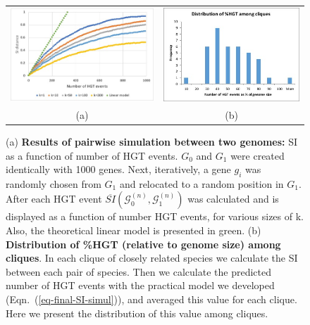 \documentclass[runningheads, 11pt]{llncs}
\newcommand{\G}{\mathcal{G}^{(n)}}
\begin{document}
\begin{figure}[tb]
\begin{center}

\begin{tabular}{cc}
\hspace{-1.5cm}
\includegraphics[width = 3.7in,angle=0]{figs/simul.jpg} &
\includegraphics[width = 3.5in,angle=0]{figs/real-data-HGT-distr.jpg} \\
 (a) & %
 (b) 
\end{tabular}
\caption{\small (a) {\bf Results of pairwise simulation between two genomes:} SI
as a function of number of HGT events. $G_0$ and $G_1$ were created identically
with 1000 genes. Next, iteratively, a gene $g_i$ was randomly chosen from $G_1$
and relocated to a random position in $G_1$. After each HGT event
$\overline{SI}(\G_0, \G_1)$ was calculated and is displayed as a function of
number HGT events, for various sizes of k. Also, the theoretical linear model is
presented in green. (b) {\bf Distribution of \%HGT (relative to genome size)
among cliques}. In each clique of closely related species we calculate the SI
between each pair of species. Then we calculate the predicted number of HGT
events with the practical model we developed (Eqn.~(\ref{eq-final-SI-simul})), and
averaged this value for each clique. Here we present the distribution of this
value among cliques.
\label{fig-simul}}
 \end{center}
\end{figure}
\end{document}
